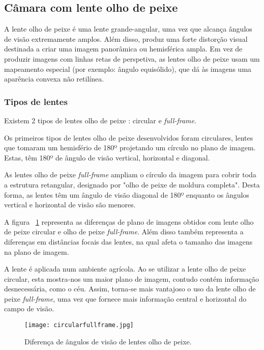 \subsection{Câmara com lente olho de peixe}

A lente olho de peixe é uma lente grande-angular, uma vez que alcança ângulos de visão extremamente amplos. Além disso, produz uma forte distorção visual destinada a criar uma imagem panorâmica ou hemisférica ampla.  Em vez de produzir imagens com linhas retas de perspetiva, as lentes olho de peixe usam um mapeamento especial (por exemplo: ângulo equisólido), que dá às imagens uma aparência convexa não retilínea.

\subsubsection{Tipos de lentes}

Existem 2 tipos de lentes olho de peixe : circular e \textit{full-frame}. 

Os primeiros tipos de lentes olho de peixe desenvolvidos foram circulares, lentes que tomaram um hemisfério de 180º projetando um círculo no plano de imagem. Estas, têm 180º de ângulo de visão vertical, horizontal e diagonal. 

As lentes olho de peixe \textit{full-frame} ampliam o círculo da imagem para cobrir toda a estrutura retangular, designado por "olho de peixe de moldura completa". Desta forma, as lentes têm um ângulo de visão diagonal de 180º enquanto os ângulos vertical e horizontal de visão são menores. 

A figura ~\ref{fig:circularfullframe} representa as diferenças de plano de imagens obtidos com lente olho de peixe circular e olho de peixe \textit{full-frame}. Além disso também representa a diferenças em distâncias focais das lentes, na qual afeta o tamanho das imagens na plano de imagem.


A lente é aplicada num ambiente agrícola. Ao se utilizar a lente olho de peixe circular, esta mostra-nos um maior plano de imagem, contudo contém informação desnecessária, como o céu. Assim, torna-se mais vantajoso o uso da lente olho de peixe \textit{full-frame}, uma vez que fornece mais informação central e horizontal do campo de visão.

\begin{figure}[h!] %
	\begin{center}
		\leavevmode		
		\texttt{[image: circularfullframe.jpg]}
		\caption{Diferença de ângulos de visão de lentes olho de peixe.}
		\label{fig:circularfullframe}
	\end{center}
\end{figure}


